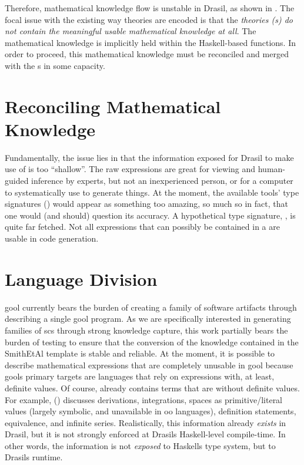 Therefore, mathematical knowledge flow is unstable in Drasil, as shown in
. The focal issue with the existing way theories
are encoded is that the \textit{theories (\RelationConcept{}s) do not contain
	the meaningful usable mathematical knowledge at all}. The mathematical knowledge
is implicitly held within the Haskell-based functions. In order to proceed, this mathematical knowledge
must be reconciled and merged with the \RelationConcept{}s in some capacity.

\theoriesWithoutModelKinds{}

\section{Reconciling Mathematical Knowledge}

Fundamentally, the issue lies in that the information exposed for Drasil to make
use of is too ``shallow''. The raw expressions are great for viewing and
human-guided inference by experts, but not an inexperienced person, or for a
computer to systematically use to generate things. At the moment, the available
tools' type signatures () would appear as something
too amazing, so much so in fact, that one would (and should) question its
accuracy. A hypothetical type signature, , is
quite far fetched. Not all expressions that can possibly be contained in a
\RelationConcept{} are usable in code generation.

\section{Language Division}

\acs{gool} currently bears the burden of creating a family of software artifacts
through describing a single \acs{gool} program. As we are specifically
interested in generating families of \acs{scs} through strong knowledge capture,
this work partially bears the burden of testing to ensure that the conversion of
the knowledge contained in the SmithEtAl template \cite{SmithAndLai2005} is
stable and reliable. At the moment, it is possible to describe mathematical
expressions that are completely unusable in \acs{gool} because \acsp{gool}
primary targets are languages that rely on expressions with, at least, definite
values. Of course, \Expr{} already contains terms that are without definite
values. For example, \Expr{} () discusses derivations,
integrations, spaces as primitive/literal values (largely symbolic, and
unavailable in \acs{oo} languages), definition statements, equivalence, and infinite series. Realistically, this information
already \textit{exists} in Drasil, but it is not strongly enforced at Drasils
Haskell-level compile-time. In other words, the information is not
\textit{exposed} to Haskells type system, but to Drasils runtime.

